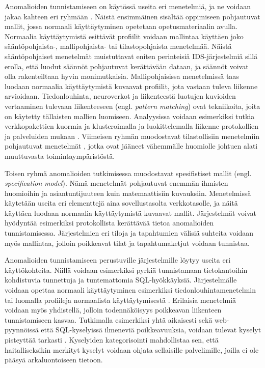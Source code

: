 Anomalioiden tunnistamiseen on käytössä useita eri menetelmiä, ja ne voidaan jakaa kahteen eri ryhmään \cite{State}. Näistä ensimmäinen sisältää oppimiseen pohjautuvat mallit, jossa normaali 
käyttäytyminen opetetaan opetusmateriaalin avulla. Normaalia käyttäytymistä esittävät profiilit voidaan mallintaa käyttäen joko sään\-tö\-poh\-jais\-ta-, mallipohjaista- tai tilastopohjaista menetelmää. Näistä
sääntöpohjaiset menetelmät muistuttavat eniten perinteisiä IDS-järjestelmiä sillä erolla, että luodut säännöt pohjautuvat kerättävään dataan, ja säännöt voivat olla rakenteiltaan hyvin monimutkaisia. 
Mallipohjaisissa menetelmissä taas luodaan normaalia käyttäytymistä kuvaavat profiilit, jota vastaan tuleva liikenne arvioidaan. Tiedonlouhinta, neuroverkot ja liikenteestä luotujen kuvioiden vertaaminen
tulevaan liikenteeseen (engl. \textit{pattern matching}) ovat tekniikoita, joita on käytetty tällaisten mallien luomiseen. Analyysissa voidaan esimerkiksi tutkia verkkopakettien kuormia \cite{Payload}\cite{ULISSE} 
ja klusteroimalla ja luokittelemalla liikenne protokollien ja palveluiden mukaan \cite{Cluster}. Viimeisen ryhmän muodostavat tilastollisiin menetelmiin pohjautuvat menetelmät \cite{PacketHeader}, jotka
ovat jääneet vähemmälle huomiolle johtuen alati muuttuvasta toimintaympäristöstä.

Toisen ryhmä anomalioiden tutkimisessa muodostavat spesifistiset mallit (engl. \textit{specification model}). Nämä menetelmät pohjautuvat enemmän ihmisten huomioihin ja asiantuntijuuteen kuin matemaattisiin
kuvauksiin. Menetelmissä käytetään useita eri elementtejä aina sovellustasolta verkkotasolle, ja näitä käyttäen luodaan normaalia käyttäytymistä kuvaavat mallit. Järjestelmät voivat hyödyntää esimerkiksi
protokollista kerättävää tietoa anomalioiden tunnistamisessa. Järjestelmien eri tiloja ja tapahtumien välisiä suhteita voidaan myös mallintaa, jolloin poikkeavat tilat ja tapahtumaketjut voidaan
tunnistaa. 

Anomalioiden tunnistamiseen perustuville järjestelmille löytyy useita eri käyttökohteita. Niillä voidaan esimerkiksi pyrkiä tunnistamaan tietokantoihin kohdistuvia tunnettuja ja tuntemattomia SQL-hyökkäyksiä.
Järjestelmälle voidaan opettaa normaali käyttäytyminen esimerkiksi tiedonlouhintamenetelmin \cite{Data} tai luomalla profiileja normaalista käyttäytymisestä \cite{SQLanomaly}\cite{SQLlearning}. Erilaisia
menetelmiä voidaan myös yhdistellä, jolloin todennäköisyys poikkeavan liikenteen tunnistamiseen kasvaa. Tutkimalla esimerkiksi yhtä aikaisesti sekä web-pyynnöissä että SQL-kyselyissä ilmeneviä poikkeavuuksia, 
voidaan tulevat kyselyt pisteyttää tarkasti \cite{WebSQL}. Kyselyiden kategorisointi mahdollistaa sen, että haitalliseksikin merkityt kyselyt voidaan ohjata sellaisille palvelimille, joilla ei ole 
pääsyä arkaluontoiseen tietoon. 

